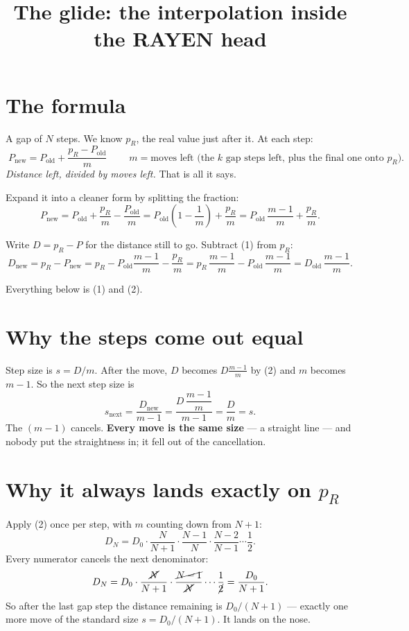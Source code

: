 \documentclass[11pt]{article}
\title{The glide: the interpolation inside the RAYEN head}
\author{}
\date{}
\begin{document}
\maketitle

\section{The formula}

A gap of $N$ steps. We know $p_R$, the real value just after it. At each step:
\[
\boxed{\;P_{\text{new}} = P_{\text{old}} + \frac{p_R - P_{\text{old}}}{m}\;}
\qquad
m = \text{moves left (the $k$ gap steps left, plus the final one onto } p_R).
\]
\emph{Distance left, divided by moves left.} That is all it says.

Expand it into a cleaner form by splitting the fraction:
\[
P_{\text{new}} = P_{\text{old}} + \frac{p_R}{m} - \frac{P_{\text{old}}}{m}
= P_{\text{old}}\left(1 - \frac1m\right) + \frac{p_R}{m}
= P_{\text{old}}\,\frac{m-1}{m} + \frac{p_R}{m}. \tag{1}
\]

Write $D = p_R - P$ for the distance still to go. Subtract (1) from $p_R$:
\[
D_{\text{new}} = p_R - P_{\text{new}}
= p_R - P_{\text{old}}\frac{m-1}{m} - \frac{p_R}{m}
= p_R\,\frac{m-1}{m} - P_{\text{old}}\,\frac{m-1}{m}
= D_{\text{old}}\,\frac{m-1}{m}. \tag{2}
\]

Everything below is (1) and (2).

\section{Why the steps come out equal}

Step size is $s = D/m$. After the move, $D$ becomes $D\frac{m-1}{m}$ by (2) and
$m$ becomes $m-1$. So the next step size is
\[
s_{\text{next}} = \frac{D_{\text{new}}}{m-1}
= \frac{D\,\dfrac{m-1}{m}}{m-1}
= \frac{D}{m}
= s .
\]
The $(m-1)$ cancels. \textbf{Every move is the same size} --- a straight line ---
and nobody put the straightness in; it fell out of the cancellation.

\section{Why it always lands exactly on $p_R$}

Apply (2) once per step, with $m$ counting down from $N+1$:
\[
D_N = D_0\cdot\frac{N}{N+1}\cdot\frac{N-1}{N}\cdot\frac{N-2}{N-1}\cdots\frac{1}{2}.
\]
Every numerator cancels the next denominator:
\[
D_N = D_0\cdot\frac{\cancel{N}}{N+1}\cdot\frac{\cancel{N-1}}{\cancel{N}}\cdots\frac{1}{\cancel{2}}
= \frac{D_0}{N+1}.
\]
So after the last gap step the distance remaining is $D_0/(N+1)$ --- exactly one
more move of the standard size $s = D_0/(N+1)$. It lands on the nose.
\end{document}
